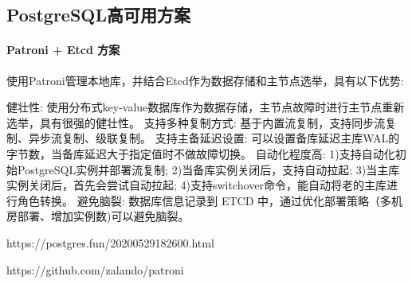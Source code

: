 \documentclass[../../../interview-questions.tex]{subfiles}
\begin{document}
\subsection{PostgreSQL高可用方案}

\paragraph{Patroni + Etcd 方案}

使用Patroni管理本地库，并结合Etcd作为数据存储和主节点选举，具有以下优势:

健壮性: 使用分布式key-value数据库作为数据存储，主节点故障时进行主节点重新选举，具有很强的健壮性。
支持多种复制方式: 基于内置流复制，支持同步流复制、异步流复制、级联复制。
支持主备延迟设置: 可以设置备库延迟主库WAL的字节数，当备库延迟大于指定值时不做故障切换。
自动化程度高: 1)支持自动化初始PostgreSQL实例并部署流复制; 2)当备库实例关闭后，支持自动拉起; 3)当主库实例关闭后，首先会尝试自动拉起; 4)支持switchover命令，能自动将老的主库进行角色转换。
避免脑裂: 数据库信息记录到 ETCD 中，通过优化部署策略（多机房部署、增加实例数)可以避免脑裂。

https://postgres.fun/20200529182600.html

https://github.com/zalando/patroni
\end{document}
